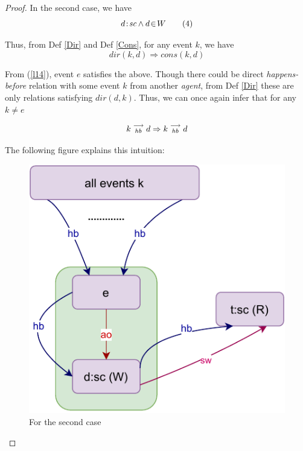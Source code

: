 \begin{proof}
    In the second case, we have 
    \[
        d\!:\!\textit{sc} \wedge d\!\in\!W
        \tag{4}
        \label{l14}
    \]
    
    Thus, from Def \ref{Dir} and Def \ref{Cons}, for any event $k$, we have 
    \[
        dir(k,d) \Rightarrow cons(k,d)
    \]
    
    From (\ref{l14}), event $e$ satisfies the above.
    Though there could be direct \textit{happens-before} relation with some event $k$ from another \textit{agent}, from Def \ref{Dir} these are only relations satisfying $dir(d,k)$. Thus, we can once again infer that for any $k \neq e$ 
    
    \[
        k\stackrel{\longrightarrow}{_{hb}}d \Rightarrow k\stackrel{\longrightarrow}{_{hb}}d
    \]
    
    The following figure explains this intuition: 
    
    \begin{figure}[H]
        \centering
        \includegraphics[scale=0.7]{InstructionReordering/Lemmas/lemma_proof1_case2.pdf}
        \caption{For the second case}
        \label{fig:my_label}
    \end{figure}
    
\end{proof}


